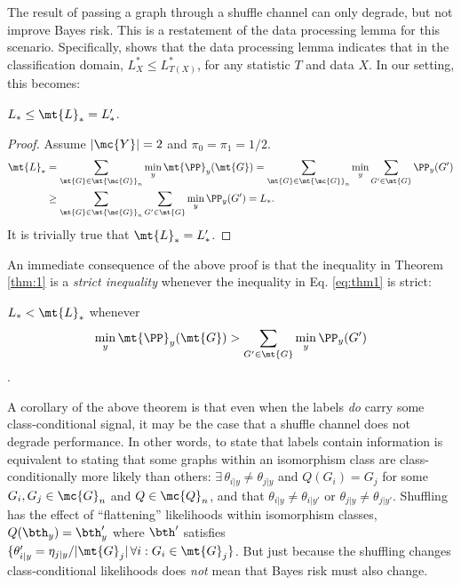 \documentclass[10pt,journal,cspaper,compsoc]{IEEEtran}
\newcommand{\Qs}{Q}
\begin{document}
The result of passing a graph through a shuffle channel can only degrade, but not improve Bayes risk.  This is a restatement of the data processing lemma for this scenario. Specifically, \cite{DEV96} shows that the data processing lemma indicates that in the classification domain, $L^*_X \leq L^*_{T(X)}$, for any statistic $T$ and data $X$.  In our setting, this becomes:

\begin{thm} \label{thm:1}
$L_* \leq \mt{L}_*=L_*'$.
\end{thm}

\begin{proof}
	Assume $|\mc{Y}|=2$ and $\pi_0=\pi_1=1/2$.  
\begin{align} \label{eq:thm1}
	\mt{L}_*&=\sum_{\mt{G} \in \mt{\mc{G}}_n} \min_y \mt{\PP}_{y}(\mt{G})
	=\sum_{\mt{G} \in \mt{\mc{G}}_n} \min_y \sum_{G' \in \mt{G}}\PP_y(G')
	\nonumber \\& \geq \sum_{\mt{G} \in \mt{\mc{G}}_n}\sum_{G' \in \mt{G}}\min_y\PP_y(G')=L_*.
\end{align}
It is trivially true that $\mt{L}_*=L_*'$.
\end{proof}



An immediate consequence of the above proof is that the inequality in Theorem \ref{thm:1} is a \emph{strict inequality} whenever the inequality in Eq. \ref{eq:thm1} is strict:

\begin{thm}
	$L_* < \mt{L}_*$ whenever $$\min_y \mt{\PP}_{y}(\mt{G}) > \sum_{G' \in \mt{G}}\min_y\PP_y(G')$$.
\end{thm}

A corollary of the above theorem is that even when the labels \emph{do} carry some class-conditional signal, it may be the case that a shuffle channel does not degrade performance.  In other words, to state that labels contain information is equivalent to stating that some graphs within an isomorphism class are class-conditionally more likely than others: $\exists \, \theta_{i|y} \neq \theta_{j|y}$ and $\Qs(G_i)=G_j$ for some $G_i,G_j \in \mc{G}_n$ and $\Qs \in \mc{Q}_n$, and that $\theta_{i|y}\neq \theta_{i|y'}$ or $\theta_{j|y}\neq \theta_{j|y'}$.  Shuffling has the effect of ``flattening'' likelihoods within isomorphism classes, $\Qs(\bth_y)=\bth_y'$ where $\bth'$ satisfies $\{\theta_{i|y}'=\eta_{j|y}/|\mt{G}_j| \, \forall i : G_i \in \mt{G}_j\}$.  But just because the shuffling changes class-conditional likelihoods does \emph{not} mean that Bayes risk must also change.
\end{document}
